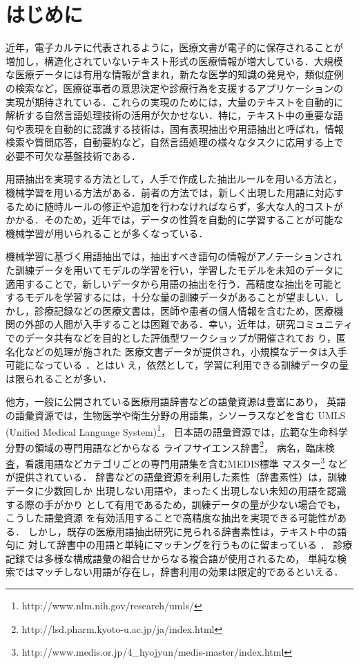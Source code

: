 \documentclass[japanese]{jnlp_1.4}
\begin{document}
\maketitle

\section{はじめに}

近年，電子カルテに代表されるように，医療文書が電子的に保存されることが
増加し，構造化されていないテキスト形式の医療情報が増大している．大規模
な医療データには有用な情報が含まれ，新たな医学的知識の発見や，類似症例
の検索など，医療従事者の意思決定や診療行為を支援するアプリケーションの
実現が期待されている．これらの実現のためには，大量のテキストを自動的に
解析する自然言語処理技術の活用が欠かせない．特に，テキスト中の重要な語
句や表現を自動的に認識する技術は，固有表現抽出や用語抽出と呼ばれ，情報
検索や質問応答，自動要約など，自然言語処理の様々なタスクに応用する上で
必要不可欠な基盤技術である．

用語抽出を実現する方法として，人手で作成した抽出ルールを用いる方法と，
機械学習を用いる方法がある．前者の方法では，新しく出現した用語に対応す
るために随時ルールの修正や追加を行わなければならず，多大な人的コストが
かかる．そのため，近年では，データの性質を自動的に学習することが可能な
機械学習が用いられることが多くなっている．

機械学習に基づく用語抽出では，抽出すべき語句の情報がアノテーションされ
た訓練データを用いてモデルの学習を行い，学習したモデルを未知のデータに
適用することで，新しいデータから用語の抽出を行う．高精度な抽出を可能と
するモデルを学習するには，十分な量の訓練データがあることが望ましい．し
かし，診療記録などの医療文書は，医師や患者の個人情報を含むため，医療機
関の外部の人間が入手することは困難である．幸い，近年は，研究コミュニティ
でのデータ共有などを目的とした評価型ワークショップが開催されてお
り\cite{uzuner20112010,morita2013overview}，匿名化などの処理が施された
医療文書データが提供され，小規模なデータは入手可能になっている ．とはい
え，依然として，学習に利用できる訓練データの量は限られることが多い．

他方，一般に公開されている医療用語辞書などの語彙資源は豊富にあり，
英語の語彙資源では，生物医学や衛生分野の用語集，シソーラスなどを含む
UMLS (Unified Medical Language System)\footnote{http://www.nlm.nih.gov/research/umls/}，
日本語の語彙資源では，広範な生命科学分野の領域の専門用語などからなる
ライフサイエンス辞書\footnote{http://lsd.pharm.kyoto-u.ac.jp/ja/index.html}，
病名，臨床検査，看護用語などカテゴリごとの専門用語集を含むMEDIS標準
マスター\footnote{http://www.medis.or.jp/4\_hyojyun/medis-master/index.html}
などが提供されている．
辞書などの語彙資源を利用した素性（辞書素性）は，訓練データに少数回しか
出現しない用語や，まったく出現しない未知の用語を認識する際の手がかり
として有用であるため，訓練データの量が少ない場合でも，こうした語彙資源
を有効活用することで高精度な抽出を実現できる可能性がある．
しかし，既存の医療用語抽出研究に見られる辞書素性は，テキスト中の語句に
対して辞書中の用語と単純にマッチングを行うものに留まっている
\cite{imaichi2013comparison,laquerre2013necla,miura2013incorporating}．
診療記録では多様な構成語彙の組合せからなる複合語が使用されるため，
単純な検索ではマッチしない用語が存在し，辞書利用の効果は限定的であるといえる．
\end{document}
